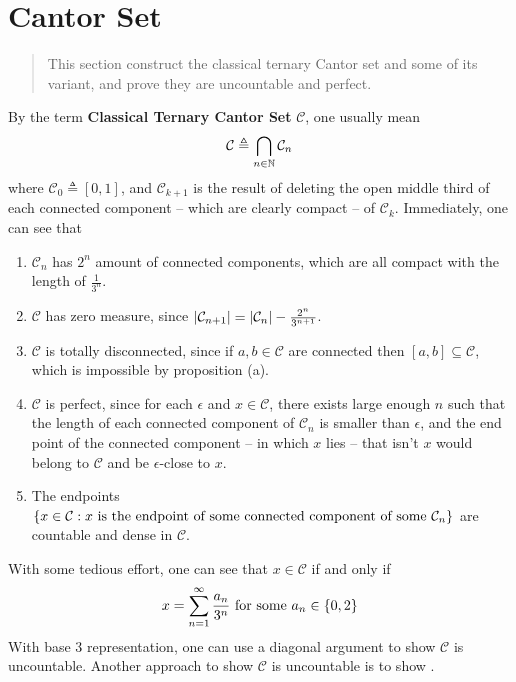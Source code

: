 \documentclass{report}
\begin{document}
\section{Cantor Set}
\label{Cantor Set}
\begin{abstract}
This section construct the classical ternary Cantor set and some of its variant, and prove they are uncountable and perfect. 
\end{abstract}
\begin{mdframed}
By the term \textbf{Classical Ternary Cantor Set} $\mathcal{C}$, one usually mean
\begin{align*}
\mathcal{C}\triangleq \bigcap_{n\in\mathbb{N}}\mathcal{C}_n
\end{align*}
where $\mathcal{C}_0 \triangleq [0,1]$, and $\mathcal{C}_{k+1}$ is the result of deleting the open middle third of each connected component -- which are clearly compact -- of $\mathcal{C}_k$. Immediately, one can see that  
\begin{enumerate}[label=(\alph*)]
  \item $\mathcal{C}_n$ has $2^n$ amount of connected components, which are all compact with the length of  $\frac{1}{3^n}$.
  \item $\mathcal{C}$ has zero measure, since $\left|\mathcal{C}_{n+1}\right|=\left|\mathcal{C}_n\right| - \frac{2^n}{3^{n+1}}$. 
  \item $\mathcal{C}$ is totally disconnected, since if $a,b \in \mathcal{C}$ are connected then $[a,b]\subseteq \mathcal{C}$, which is impossible by proposition (a). 
  \item $\mathcal{C}$ is perfect, since for each $\epsilon $ and $x\in\mathcal{C}$, there exists large enough $n$ such that the length of each connected component of $\mathcal{C}_n$ is smaller than $\epsilon $, and the end point of the connected component -- in which $x$ lies -- that isn't $x$ would belong to $\mathcal{C}$ and be $\epsilon $-close to $x$.  
  \item The endpoints $\{ x\in \mathcal{C}:x\text{ is the endpoint of some connected component of some }\mathcal{C}_n  \}$ are countable and dense in $\mathcal{C}$. 
\end{enumerate} 
With some tedious effort, one can see that $x\in\mathcal{C}$ if and only if 
\begin{align*}
x=\sum_{n=1}^{\infty} \frac{a_n}{3^n}\text{ for some }a_n \in \{ 0,2 \}
\end{align*}
With base $3$ representation, one can use a diagonal argument to show $\mathcal{C}$ is uncountable. Another approach to show $\mathcal{C}$ is uncountable is to show .
\end{mdframed}
\end{document}
